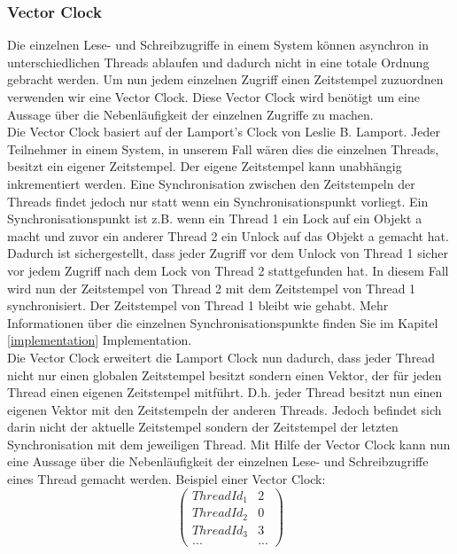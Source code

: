\documentclass[10pt,a4paper]{article}
\begin{document}
\subsubsection{Vector Clock}
\begin{flushleft}
Die einzelnen Lese- und Schreibzugriffe in einem System können asynchron in unterschiedlichen Threads ablaufen und dadurch nicht in eine totale Ordnung gebracht werden. Um nun jedem einzelnen Zugriff einen Zeitstempel zuzuordnen verwenden wir eine Vector Clock. Diese Vector Clock wird benötigt um eine Aussage über die Nebenläufigkeit der einzelnen Zugriffe zu machen.\\
Die Vector Clock basiert auf der Lamport's Clock von Leslie B. Lamport. Jeder Teilnehmer in einem System, in unserem Fall wären dies die einzelnen Threads, besitzt ein eigener Zeitstempel. Der eigene Zeitstempel kann unabhängig inkrementiert werden. Eine Synchronisation zwischen den Zeitstempeln der Threads findet jedoch nur statt wenn ein Synchronisationspunkt vorliegt. Ein Synchronisationspunkt ist z.B. wenn ein Thread 1 ein Lock auf ein Objekt a macht und zuvor ein anderer Thread 2 ein Unlock auf das Objekt a gemacht hat. Dadurch ist sichergestellt, dass jeder Zugriff vor dem Unlock von Thread 1 sicher vor jedem Zugriff nach dem Lock von Thread 2 stattgefunden hat. In diesem Fall wird nun der Zeitstempel von Thread 2 mit dem Zeitstempel von Thread 1 synchronisiert. Der Zeitstempel von Thread 1 bleibt wie gehabt. Mehr Informationen über die einzelnen Synchronisationspunkte finden Sie im Kapitel \ref{implementation} Implementation.\\
Die Vector Clock erweitert die Lamport Clock nun dadurch, dass jeder Thread nicht nur einen globalen Zeitstempel besitzt sondern einen Vektor, der für jeden Thread einen eigenen Zeitstempel mitführt. D.h. jeder Thread besitzt nun einen eigenen Vektor mit den Zeitstempeln der anderen Threads. Jedoch befindet sich darin nicht der aktuelle Zeitstempel sondern der Zeitstempel der letzten Synchronisation mit dem jeweiligen Thread. Mit Hilfe der Vector Clock kann nun eine Aussage über die Nebenläufigkeit der einzelnen Lese- und Schreibzugriffe eines Thread gemacht werden.
\newpage
Beispiel einer Vector Clock:\\
\[
	\begin{pmatrix}
		ThreadId_1 & 2\\
		ThreadId_2 & 0\\
		ThreadId_3 & 3\\
		... & ...
	\end{pmatrix}
\]
\end{flushleft}
\end{document}
